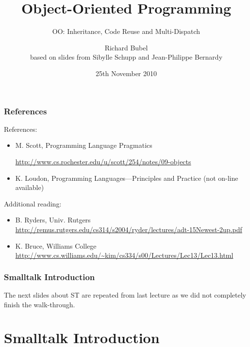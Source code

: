 \documentclass{beamer}
\title[OOP]{Object-Oriented Programming}
\subtitle[Inheritance, Reuse etc.]{OO: Inheritance, Code Reuse and Multi-Dispatch}
\author[Richard Bubel] %
{Richard Bubel \\ based on slides from Sibylle Schupp and Jean-Philippe Bernardy}
\institute[CTH]{Chalmers University of Technology}
\date{25th November 2010}%
\begin{document}
\begin{frame}
  \titlepage
\end{frame}

\begin{frame}[fragile]
\frametitle{References}
References:
\begin{itemize}
\item M. Scott, Programming Language Pragmatics

\url{http://www.cs.rochester.edu/u/scott/254/notes/09-objects}
\item K. Loudon, Programming Languages---Principles and Practice
(not on-line available)
\end{itemize}

Additional reading:
\begin{itemize}
\item B. Ryders, Univ. Rutgers
\url{
http://remus.rutgers.edu/cs314/s2004/ryder/lectures/adt-15Newest-2up.pdf
}
%
\item K. Bruce, Williams College
\url{
http://www.cs.williams.edu/~kim/cs334/s00/Lectures/Lec13/Lec13.html}
\end{itemize}
\end{frame}

\begin{frame}[fragile]
\frametitle{Smalltalk Introduction}
The next slides about ST are repeated from last lecture as we did not
completely finish the walk-through. 
\end{frame}



\section{Smalltalk Introduction}
\end{document}
